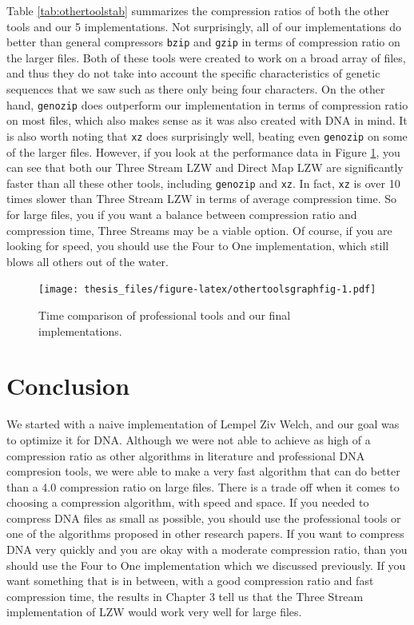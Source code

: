 \documentclass[12pt,twoside]{reedthesis}
\begin{document}
Table \ref{tab:othertoolstab} summarizes the compression ratios of both the other tools and our 5 implementations. Not surprisingly, all of our implementations do better than general compressors \texttt{bzip} and \texttt{gzip} in terms of compression ratio on the larger files. Both of these tools were created to work on a broad array of files, and thus they do not take into account the specific characteristics of genetic sequences that we saw such as there only being four characters. On the other hand, \texttt{genozip} does outperform our implementation in terms of compression ratio on most files, which also makes sense as it was also created with DNA in mind. It is also worth noting that \texttt{xz} does surprisingly well, beating even \texttt{genozip} on some of the larger files. However, if you look at the performance data in Figure \ref{fig:othertoolsgraphfig}, you can see that both our Three Stream LZW and Direct Map LZW are significantly faster than all these other tools, including \texttt{genozip} and \texttt{xz}. In fact, \texttt{xz} is over 10 times slower than Three Stream LZW in terms of average compression time. So for large files, you if you want a balance between compression ratio and compression time, Three Streams may be a viable option. Of course, if you are looking for speed, you should use the Four to One implementation, which still blows all others out of the water.
\begin{figure}
\centering
\texttt{[image: thesis\_files/figure-latex/othertoolsgraphfig-1.pdf]}
\caption{\label{fig:othertoolsgraphfig}Time comparison of professional tools and our final implementations.}
\end{figure}
\hypertarget{conclusion}{%
\chapter*{Conclusion}\label{conclusion}}

We started with a naive implementation of Lempel Ziv Welch, and our goal was to optimize it for DNA. Although we were not able to achieve as high of a compression ratio as other algorithms in literature and professional DNA compresion tools, we were able to make a very fast algorithm that can do better than a 4.0 compression ratio on large files. There is a trade off when it comes to choosing a compression algorithm, with speed and space. If you needed to compress DNA files as small as possible, you should use the professional tools or one of the algorithms proposed in other research papers. If you want to compress DNA very quickly and you are okay with a moderate compression ratio, than you should use the Four to One implementation which we discussed previously. If you want something that is in between, with a good compression ratio and fast compression time, the results in Chapter 3 tell us that the Three Stream implementation of LZW would work very well for large files.
\end{document}
